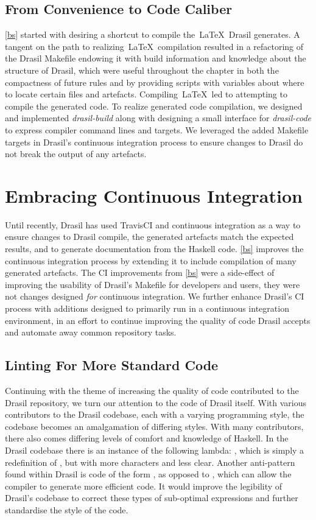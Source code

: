 {{{{{\section{From Convenience to Code Caliber}\label{bsConclusion}
\autoref{bs} started with desiring a shortcut to compile the\ \LaTeX\ Drasil generates. A tangent on the path to realizing\ \LaTeX\ compilation resulted in a refactoring of the Drasil Makefile endowing it with build information and knowledge about the structure of Drasil, which were useful throughout the chapter in both the compactness of future rules and by providing scripts with variables about where to locate certain files and artefacts. Compiling\ \LaTeX\ led to attempting to compile the generated code. To realize generated code compilation, we designed and implemented \textit{drasil-build} along with designing a small interface for \textit{drasil-code} to express compiler command lines and targets. We leveraged the added Makefile targets in Drasil's continuous integration process to ensure changes to Drasil do not break the output of any artefacts.


\chapter{Embracing Continuous Integration}\label{contInt}
Until recently, Drasil has used TravisCI and continuous integration as a way to ensure changes to Drasil compile, the generated artefacts match the expected results, and to generate documentation from the Haskell code. \autoref{bs} improves the continuous integration process by extending it to include compilation of many generated artefacts. The CI improvements from \autoref{bs} were a side-effect of improving the usability of Drasil's Makefile for developers and users, they were not changes designed \textit{for} continuous integration. We further enhance Drasil's CI process with additions designed to primarily run in a continuous integration environment, in an effort to continue improving the quality of code Drasil accepts and automate away common repository tasks.

\section{Linting For More Standard Code}\label{bsHLint}

Continuing with the theme of increasing the quality of code contributed to the Drasil repository, we turn our attention to the code of Drasil itself. With various contributors to the Drasil codebase, each with a varying programming style, the codebase becomes an amalgamation of differing styles. With many contributors, there also comes differing levels of comfort and knowledge of Haskell. In the Drasil codebase there is an instance of the following lambda: , which is simply a redefinition of , but with more characters and less clear. Another anti-pattern found within Drasil is code of the form , as opposed to , which can allow the compiler to generate more efficient code. It would improve the legibility of Drasil's codebase to correct these types of sub-optimal expressions and further standardise the style of the code.

}}}}}
